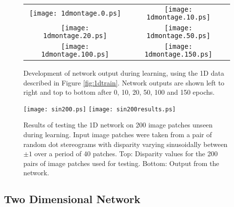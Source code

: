 \documentclass[a4paper]{article}
\begin{document}
\begin{figure}[htbp]
  \begin{center}
    \leavevmode

    \begin{tabular}{cc}


      \texttt{[image: 1dmontage.0.ps]} &
      \texttt{[image: 1dmontage.10.ps]} \\

      \texttt{[image: 1dmontage.20.ps]} &
      \texttt{[image: 1dmontage.50.ps]} \\

      \texttt{[image: 1dmontage.100.ps]} &
      \texttt{[image: 1dmontage.150.ps]}

    \end{tabular}
    \caption{Development of network output during learning, using
      the 1D data described in Figure \protect \ref{fig:1dtrain}.
      Network outputs are shown left to right and top to bottom after
      0, 10, 20, 50, 100 and 150 epochs.}
    \label{fig:1doutputevolution}
  \end{center}
\end{figure}


\begin{figure}[htbp]
  \begin{center}
    \leavevmode
    \texttt{[image: sin200.ps]}
    \texttt{[image: sin200results.ps]}
    \caption{Results of testing the 1D network on 200 image patches
      unseen during learning.  Input image patches were taken from a
      pair of random dot stereograms with disparity varying
      sinusoidally between $\pm 1$ over a period of 40 patches.
      Top:  Disparity values for the 200 pairs of image
      patches used for testing.  Bottom: Output from the network.}
    \label{fig:1dtest}
  \end{center}
\end{figure}



\clearpage
\subsection{Two Dimensional Network}
\end{document}
